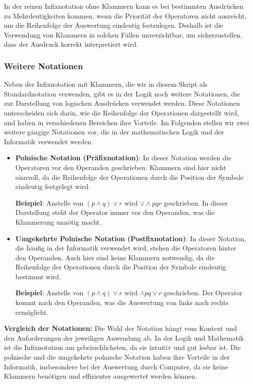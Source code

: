 \documentclass[main.tex]{subfiles}
\begin{document}
\begin{remark}
In der reinen Infixnotation ohne Klammern kann es bei bestimmten Ausdrücken zu Mehrdeutigkeiten kommen, wenn die Priorität der Operatoren nicht ausreicht, um die Reihenfolge der Auswertung eindeutig festzulegen. Deshalb ist die Verwendung von Klammern in solchen Fällen unverzichtbar, um sicherzustellen, dass der Ausdruck korrekt interpretiert wird.
\end{remark}

\subsubsection{Weitere Notationen}

Neben der Infixnotation mit Klammern, die wir in diesem Skript als Standardnotation verwenden, gibt es in der Logik noch weitere Notationen, die zur Darstellung von logischen Ausdrücken verwendet werden. Diese Notationen unterscheiden sich darin, wie die Reihenfolge der Operationen dargestellt wird, und haben in verschiedenen Bereichen ihre Vorteile. Im Folgenden stellen wir zwei weitere gängige Notationen vor, die in der mathematischen Logik und der Informatik verwendet werden.

\begin{itemize}
    \item \textbf{Polnische Notation (Präfixnotation)}: In dieser Notation werden die Operatoren vor den Operanden geschrieben. Klammern sind hier nicht sinnvoll, da die Reihenfolge der Operationen durch die Position der Symbole eindeutig festgelegt wird.
    
    \textbf{Beispiel}: Anstelle von \((p \land q) \lor r\) wird \(\lor \land p q r\) geschrieben. In dieser Darstellung steht der Operator immer vor den Operanden, was die Klammerung unnötig macht.
    
    \item \textbf{Umgekehrte Polnische Notation (Postfixnotation)}: In dieser Notation, die häufig in der Informatik verwendet wird, stehen die Operatoren hinter den Operanden. Auch hier sind keine Klammern notwendig, da die Reihenfolge der Operationen durch die Position der Symbole eindeutig bestimmt wird.
    
    \textbf{Beispiel}: Anstelle von \((p \land q) \lor r\) wird \(\land p q \lor r\) geschrieben. Der Operator kommt nach den Operanden, was die Auswertung von links nach rechts ermöglicht.
\end{itemize}

\textbf{Vergleich der Notationen:} 
Die Wahl der Notation hängt vom Kontext und den Anforderungen der jeweiligen Anwendung ab. In der Logik und Mathematik ist die Infixnotation am gebräuchlichsten, da sie intuitiv und gut lesbar ist. Die polnische und die umgekehrte polnische Notation haben ihre Vorteile in der Informatik, insbesondere bei der Auswertung durch Computer, da sie keine Klammern benötigen und effizienter ausgewertet werden können.
\end{document}
